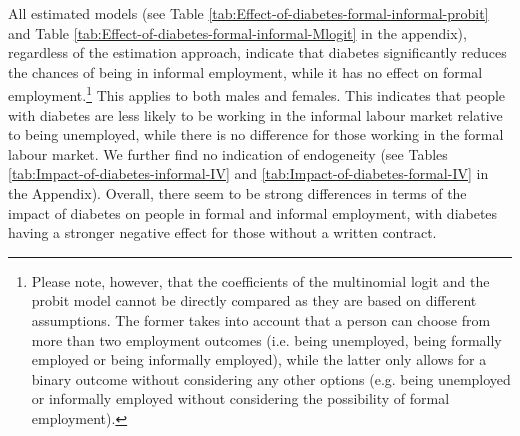 All estimated models (see Table \ref{tab:Effect-of-diabetes-formal-informal-probit}
and Table \ref{tab:Effect-of-diabetes-formal-informal-Mlogit} in the appendix), regardless
of the estimation approach,  indicate that diabetes significantly
reduces the chances of being in informal employment, while it has
no effect on formal employment.\footnote{Please note, however, that the coefficients of the multinomial logit
and the probit model cannot be directly compared as they are based
on different assumptions. The former takes into account that a person
can choose from more than two employment outcomes (i.e. being unemployed,
being formally employed or being informally employed), while the latter
only allows for a binary outcome without considering any other options
(e.g. being unemployed or informally employed without considering
the possibility of formal employment).} This applies to both males and females. This indicates that people
with diabetes are less likely to be working in the informal labour
market relative to being unemployed, while there is no difference
for those working in the formal labour market. We further find no
indication of endogeneity (see Tables \ref{tab:Impact-of-diabetes-informal-IV}
and \ref{tab:Impact-of-diabetes-formal-IV} in the Appendix). Overall,
there seem to be strong differences in terms of the impact of diabetes
on people in formal and informal employment, with diabetes having
a stronger negative effect for those without a written contract.
\afterpage{\clearpage}
